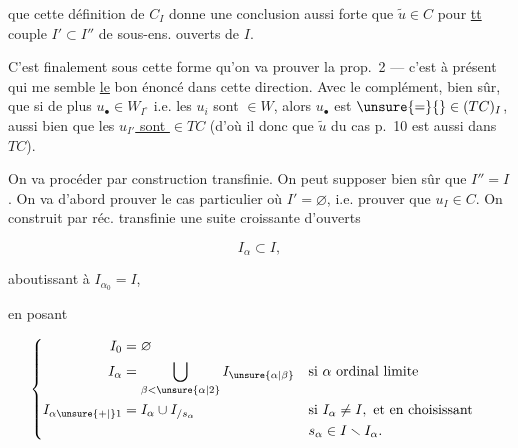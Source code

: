 

que cette définition de $C_I$ donne une conclusion aussi forte que $\widetilde u\in C$ pour \uline{tt} couple $I'\subset I''$ de sous-ens. ouverts de $I$.

C’est finalement sous cette forme qu’on va prouver la prop.~2 --- c’est \uline{} à présent qui me semble \uline{le} bon énoncé dans cette direction. Avec le complément, bien sûr, que si de plus $u_\bullet\in W_{I^\circ}$ i.e. les $u_i$ sont $\in W$, alors $u_\bullet$ est $\unsure{=}{}\in(TC)_I$,  aussi bien que  les \uline{$u_{I'}$ sont $\in TC$} (d’où il   donc que $\widetilde u$ du cas p.~10 est aussi dans $TC$).

On va procéder par construction transfinie. On peut supposer bien sûr que $I''=I$. On va  d’abord prouver le cas particulier   où $I'=\varnothing$, i.e. prouver   que $u_I\in C$. On  construit par réc. transfinie une suite  croissante d’ouverts

\[
 I_\alpha\subset I,
\]

aboutissant à $I_{\alpha_0}=I$,

en posant

\[
\left\{\begin{aligned}
 I_0&=\varnothing\\
 I_\alpha&=\bigcup_{\beta<\unsure{\alpha|2}}I_{\unsure{\alpha|\beta}}
       &&\text{si }\alpha\text{ ordinal limite}\\
 I_{\alpha\unsure{+|{}}1}&=I_\alpha\cup I_{/s_\alpha}
       &&\text{si }I_\alpha\ne I,\text{ et en choisissant}\\
 &&&s_\alpha\in I\smallsetminus I_\alpha.
\end{aligned}\right.
\]

